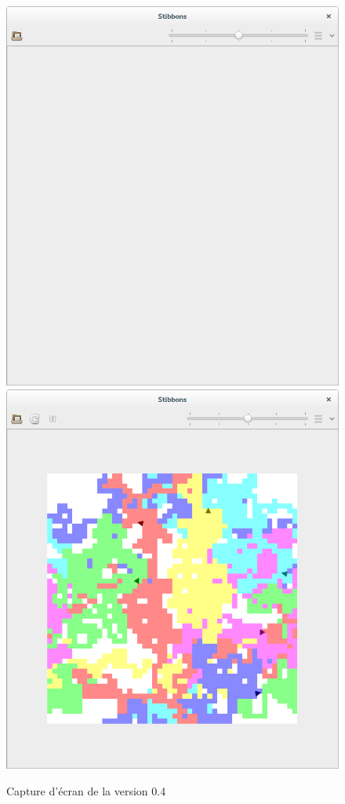 \begin{figure}[h]
\centering
\includegraphics[scale=0.25]{doc/report/screenshot/stibbons-0-4-1.png}
\includegraphics[scale=0.25]{doc/report/screenshot/stibbons-0-4-2.png}
\caption{\label{screenshot-0.4} Capture d'écran de la version 0.4}
\end{figure}

